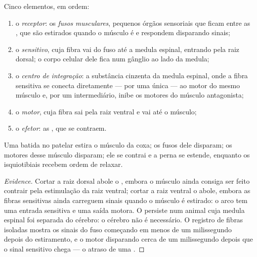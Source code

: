 \begin{proposition}\label{prop:g12:stretch-reflex:arc}
Cinco elementos, em ordem:
\begin{enumerate}
  \item o \emph{receptor}: os \emph{fusos musculares}, pequenos órgãos
        sensoriais que ficam entre as , que são
        estirados quando o músculo é e respondem disparando sinais;
  \item o \emph{ sensitivo}, cuja fibra vai do fuso até a
        medula espinal, entrando pela raiz dorsal; o corpo celular dele
        fica num gânglio ao lado da medula;
  \item o \emph{centro de integração}: a substância cinzenta da medula
        espinal, onde a fibra sensitiva se conecta diretamente --- por
        uma única  --- ao  motor do mesmo músculo e, por
        um  intermediário, inibe os  motores do
        músculo antagonista;
  \item o \emph{ motor}, cuja fibra sai pela raiz ventral e vai
        até o músculo;
  \item o \emph{efetor}: as , que se contraem.
\end{enumerate}
Uma batida no  patelar estira o músculo da coxa; os fusos dele
disparam; os  motores desse músculo disparam; ele se contrai e
a perna se estende, enquanto os isquiotibiais recebem ordem de relaxar.
\end{proposition}
\begin{proof}[Evidence]
Cortar a raiz dorsal abole o , embora o músculo ainda consiga
ser feito contrair pela estimulação da raiz ventral; cortar a raiz
ventral o abole, embora as fibras sensitivas ainda carreguem sinais
quando o músculo é estirado: o arco tem uma entrada sensitiva e uma
saída motora. O  persiste num animal cuja medula espinal foi
separada do cérebro: o cérebro não é necessário. O registro de fibras
isoladas mostra os sinais do fuso começando em menos de um
milissegundo depois do estiramento, e o  motor disparando
cerca de um milissegundo depois que o sinal sensitivo chega --- o
atraso de uma .
\end{proof}

